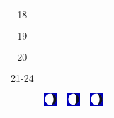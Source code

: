 \documentclass[a4paper,12pt, tikz]{scrartcl}
\begin{document}
\begin{tabularx}{\linewidth}{|c|X|X|X|}
      \hline
      18&   &       &    \\
        &   &       &    \\
      \hline
      19&   &       &    \\
        &   &       &    \\
      \hline
      20&   &       &    \\
        &   &       &    \\
      \hline
      21-24&   &       &    \\
        &   &       &    \\
      \hline  
      & \vspace{0.01cm} \centerline{\includegraphics[width=0.5cm]{moon_phases/Moon_phase_5.svg.png}} \vspace{0.1cm} & \vspace{0.01cm} \centerline{\includegraphics[width=0.5cm]{moon_phases/Moon_phase_5.svg.png}} \vspace{0.1cm} & \vspace{0.01cm} \centerline{\includegraphics[width=0.5cm]{moon_phases/Moon_phase_5.svg.png}} \vspace{0.1cm}\\
      \hline   
    \end{tabularx}




    \newpage

        \noindent
\end{document}
